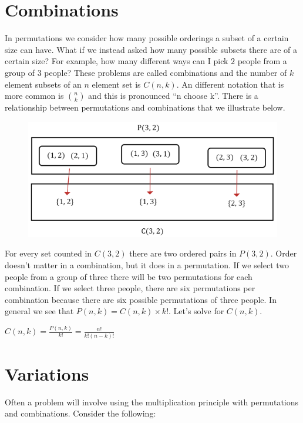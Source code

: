 \documentclass[]{book}
\begin{document}
\section{Combinations}\label{combinations}

In permutations we consider how many possible orderings a subset of a
certain size can have. What if we instead asked how many possible
subsets there are of a certain size? For example, how many different
ways can I pick \(2\) people from a group of \(3\) people? These
problems are called combinations and the number of \(k\) element subsets
of an \(n\) element set is \(C(n,k)\). An different notation that is
more common is \(n \choose k\) and this is pronounced ``n choose k''.
There is a relationship between permutations and combinations that we
illustrate below.

\begin{figure}
\centering
\includegraphics{Pictures/02-Counting/P(3,2)vsC(3,2).PNG}
\caption{}
\end{figure}

For every set counted in \(C(3,2)\) there are two ordered pairs in
\(P(3,2)\). Order doesn't matter in a combination, but it does in a
permutation. If we select two people from a group of three there will be
two permutations for each combination. If we select three people, there
are six permutations per combination because there are six possible
permutations of three people. In general we see that
\(P(n,k) = C(n,k)\times k!\). Let's solve for \(C(n,k)\).

\(C(n,k) = \frac{P(n,k)}{k!} = \frac{n!}{k!(n-k)!}\)

\section{Variations}\label{variations}

Often a problem will involve using the multiplication principle with
permutations and combinations. Consider the following:
\end{document}
